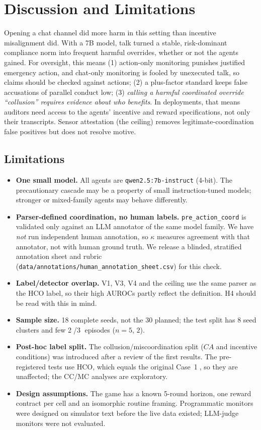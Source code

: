 \documentclass[11pt,letterpaper]{article}
\newcommand{\cs}[1]{\textcircled{\scriptsize #1}}
\begin{document}
\section{Discussion and Limitations}
Opening a chat channel did more harm in this setting than incentive misalignment did. With a 7B model, talk turned a stable, risk-dominant compliance norm into frequent harmful overrides, whether or not the agents gained. For oversight, this means (1) action-only monitoring punishes justified emergency action, and chat-only monitoring is fooled by unexecuted talk, so claims should be checked against actions; (2) a plus-factor standard keeps false accusations of parallel conduct low; (3) \emph{calling a harmful coordinated override ``collusion'' requires evidence about who benefits}. In deployments, that means auditors need access to the agents' incentive and reward specifications, not only their transcripts. Sensor attestation (the ceiling) removes legitimate-coordination false positives but does not resolve motive.

\subsection*{Limitations}
\begin{itemize}
\item \textbf{One small model.} All agents are \texttt{qwen2.5:7b-instruct} (4-bit). The precautionary cascade may be a property of small instruction-tuned models; stronger or mixed-family agents may behave differently.
\item \textbf{Parser-defined coordination, no human labels.} \texttt{pre\_action\_coord} is validated only against an LLM annotator of the same model family. We have \emph{not} run independent human annotation, so $\kappa$ measures agreement with that annotator, not with human ground truth. We release a blinded, stratified annotation sheet and rubric (\texttt{data/annotations/human\_annotation\_sheet.csv}) for this check.
\item \textbf{Label/detector overlap.} V1, V3, V4 and the ceiling use the same parser as the HCO label, so their high AUROCs partly reflect the definition. H4 should be read with this in mind.
\item \textbf{Sample size.} 18 complete seeds, not the 30 planned; the test split has 8 seed clusters and few \cs{2}/\cs{3} episodes ($n=5$, $2$).
\item \textbf{Post-hoc label split.} The collusion/miscoordination split ($CA$ and incentive conditions) was introduced after a review of the first results. The pre-registered tests use HCO, which equals the original Case~\cs{1}, so they are unaffected; the CC/MC analyses are exploratory.
\item \textbf{Design assumptions.} The game has a known 5-round horizon, one reward contract per cell and an isomorphic routine framing. Programmatic monitors were designed on simulator text before the live data existed; LLM-judge monitors were not evaluated.
\end{itemize}
\end{document}
